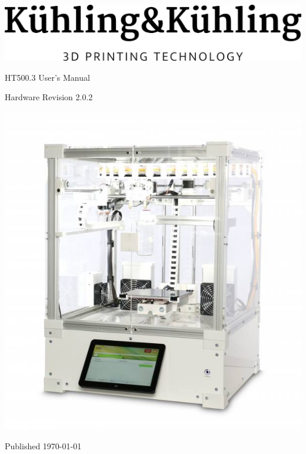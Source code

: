 \documentclass[english, a4paper]{article}
\newcommand{\hardwarerevision}{2.0.2}
\begin{document}

\begin{titlepage}
  \centering
  \includegraphics[width=.2\linewidth]{./img/logo_kuehlingkuehling.png}
  \par\vspace{1cm}
  \par\Huge HT500.3 User's Manual
  \par\vspace{1cm}
  \par\large Hardware Revision \hardwarerevision
  \par\vspace{3cm}
  \includegraphics[width=.7\linewidth]{./img/ht500_freigestellt.jpg}
  \vfill
  \par\large Published \today
\end{titlepage}

\clearpage
\thispagestyle{empty}
\mbox{}
\vfill


\clearpage
{}
\tableofcontents

\clearpage
{}











\clearpage
{}
\renewcommand*{\thepage}{Q-\arabic{page}}

\end{document}
